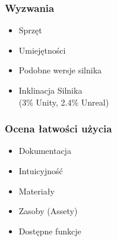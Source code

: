 \documentclass{beamer}
\begin{document}
        {
          \begin{frame}
          \end{frame}
          }
        \begin{frame}
          \frametitle{Wyzwania}
          \begin{itemize}
            \item Sprzęt 
            \item Umiejętności 
            \item Podobne wersje silnika 
            \item Inklinacja Silnika \\ (3\% Unity, 2.4\% Unreal) 
          \end{itemize}  
        \end{frame}  

      \begin{frame} 
        \frametitle{Ocena łatwości użycia}
        \begin{itemize}
          \item Dokumentacja
          \item Intuicyjność
          \item Materiały 
          \item Zasoby (Assety)  
          \item Dostępne funkcje
        \end{itemize}
      \end{frame}
\end{document}
